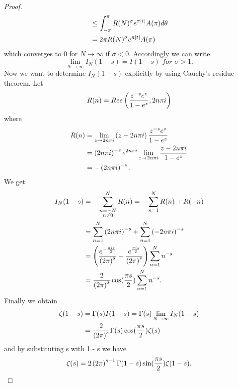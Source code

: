 \begin{proof}
\begin{equation*}
\begin{aligned}
	&\leq \int_{-\pi}^{\pi} R(N)^\sigma e^{\pi \left|t\right|} A(\pi) d\theta \\
	&= 2 \pi R(N)^\sigma e^{\pi \left|t\right|} A(\pi)
\end{aligned}
\end{equation*}
	which converges to $0$ for $N \to \infty$ if $\sigma < 0$. Accordingly we can write
\begin{equation*}
	\lim\limits_{N \to \infty} I_N(1 - s) = I(1 - s) \textit{ for } \sigma > 1.
\end{equation*}
	Now we want to determine $I_N(1 - s)$ explicitly by using Cauchy's residue theorem. Let
\begin{equation*}
	R(n) = Res\left(\frac{z^{-s} e^z}{1 - e^z}, 2 n \pi i\right)
\end{equation*}
	where
\begin{equation*}
\begin{aligned}
	R(n) &= \lim\limits_{z \to 2 n \pi i} \left(z - 2 n \pi i\right) \frac{z^{-s} e^z}{1 - e^z} \\
	&= \left(2 n \pi i\right)^{-s} e^{2 n \pi i} \lim\limits_{z \to 2 n \pi i} \frac{z - 2 n \pi i}{1 - e^z} \\
	&= - \left(2 n \pi i\right)^{-s}.
\end{aligned} 
\end{equation*}
	We get
\begin{equation*}
\begin{aligned}	
	I_N(1 - s)
	&= - \sum _{\substack{n = -N \\ n \neq 0}} ^N R(n) = - \sum _{n = 1} ^N R(n) + R(-n) \\
	&= \sum _{n = 1} ^N \left(2 n \pi i\right)^{-s} + \sum _{n = 1} ^N \left(-2 n \pi i\right)^{-s} \\
	&= \left(\frac{e^{-\frac{\pi i s}{2}}}{\left(2 \pi\right)^s} + \frac{e^{\frac{\pi i s}{2}}}{\left(2 \pi\right)^s}\right) \sum _{n = 1} ^N n^{-s} \\
	&= \frac{2}{\left(2 \pi\right)^s} \cos(\frac{\pi s}{2}) \sum _{n = 1} ^N n^{-s}.
\end{aligned}
\end{equation*}
	Finally we obtain
\begin{equation*}
\begin{aligned}
	\zeta(1 - s) &= \Gamma(s) I(1 - s) = \Gamma(s) \lim\limits_{N \to \infty} I_N(1 - s) \\
	&= \frac{2}{\left(2 \pi\right)^s} \Gamma(s) \cos(\frac{\pi s}{2}) \zeta(s)
\end{aligned}
\end{equation*}
	and by substituting s with 1 - s we have
\begin{equation*}
	\zeta(s) = 2\left(2 \pi\right)^{s - 1} \Gamma(1 - s) \sin(\frac{\pi s}{2}) \zeta(1 - s).
\end{equation*}
\end{proof}


